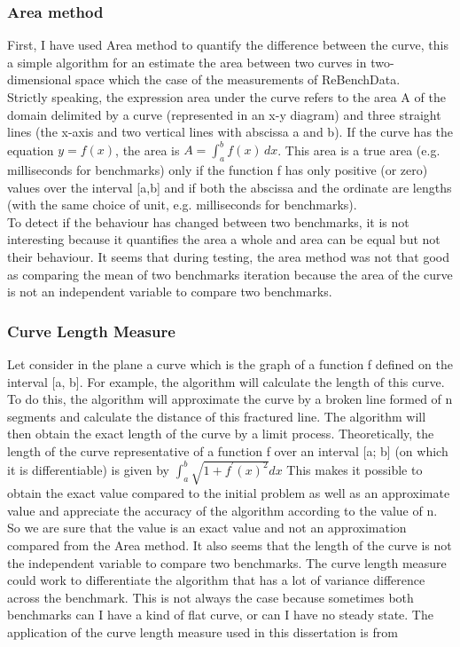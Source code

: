\documentclass[12pt,a4paper]{article}
\begin{document}
\subsubsection{Area method}

First, I have used Area \citep{jekel2019similarity} method to quantify the difference between the curve, this a simple algorithm for an estimate the area between two curves in two-dimensional space which the case of the measurements of ReBenchData.\\
Strictly speaking, the expression area under the curve refers to the area A of the domain delimited by a curve (represented in an x-y diagram) and three straight lines (the x-axis and two vertical lines with abscissa a and b). If the curve has the equation $y=f(x)$, the area is $A=\int _{a}^{b}f(x)\, {d} x$. This area is a true area (e.g. milliseconds for benchmarks) only if the function f has only positive (or zero) values over the interval [a,b] and if both the abscissa and the ordinate are lengths (with the same choice of unit, e.g. milliseconds for benchmarks).\\
To detect if the behaviour has changed between two benchmarks, it is not interesting because it quantifies the area a whole and area can be equal but not their behaviour.
It seems that during testing, the area method was not that good as comparing the mean of two benchmarks iteration because the area of the curve is not an independent variable to compare two benchmarks.

\subsubsection{Curve Length Measure}


Let consider in the plane a curve \citep{moran1966measuring} which is the graph of a function f defined on the interval [a, b]. For example, the algorithm will calculate the length of this curve. To do this, the algorithm will approximate the curve by a broken line formed of n segments and calculate the distance of this fractured line. The algorithm will then obtain the exact length of the curve by a limit process.
Theoretically, the length of the curve representative of a function f over an interval [a; b] (on which it is differentiable) is given by $\int_{a}^{b} \sqrt{1+f^{\prime}(x)^{2}} d x$
This makes it possible to obtain the exact value compared to the initial problem as well as an approximate value and appreciate the accuracy of the algorithm according to the value of n. So we are sure that the value is an exact value and not an approximation compared from the Area method. It also seems that the length of the curve is not the independent variable to compare two benchmarks.
The curve length measure could work to differentiate the algorithm that has a lot of variance difference across the benchmark. This is not always the case because sometimes both benchmarks can I have a kind of flat curve, or can I have no steady state.
The application of the curve length measure used in this dissertation is from \citep{jekel2019similarity}
\end{document}
